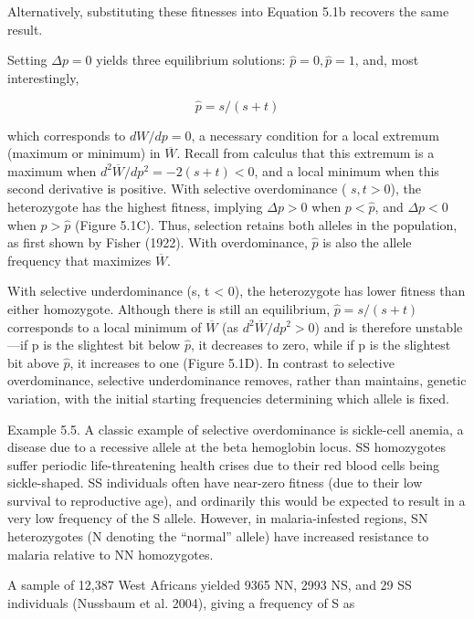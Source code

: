\documentclass{article}
\begin{document}
Alternatively, substituting these fitnesses into Equation 5.1b recovers the same result.

Setting  $ \Delta p = 0 $ yields three equilibrium solutions:  $ \widehat{p} = 0, \widehat{p} = 1 $, and, most interestingly,

\begin{equation}
\widehat{p}=s/(s+t)
\end{equation}

which corresponds to  $ dW/dp = 0 $, a necessary condition for a local extremum (maximum or minimum) in  $ \overline{W} $. Recall from calculus that this extremum is a maximum when  $ d^2\overline{W}/dp^2 = -2(s + t) < 0 $, and a local minimum when this second derivative is positive. With selective overdominance ( $ s, t > 0 $), the heterozygote has the highest fitness, implying  $ \Delta p > 0 $ when  $ p < \widehat{p} $, and  $ \Delta p < 0 $ when  $ p > \widehat{p} $ (Figure 5.1C). Thus, selection retains both alleles in the population, as first shown by Fisher (1922). With overdominance,  $ \widehat{p} $ is also the allele frequency that maximizes  $ \overline{W} $.

With selective underdominance (s, t < 0), the heterozygote has lower fitness than either homozygote. Although there is still an equilibrium,  $ \widehat{p} = s/(s + t) $ corresponds to a local minimum of  $ \overline{W} $ (as  $ d^2 \overline{W}/dp^2 > 0 $) and is therefore unstable—if p is the slightest bit below  $ \widehat{p} $, it decreases to zero, while if p is the slightest bit above  $ \widehat{p} $, it increases to one (Figure 5.1D). In contrast to selective overdominance, selective underdominance removes, rather than maintains, genetic variation, with the initial starting frequencies determining which allele is fixed.

Example 5.5. A classic example of selective overdominance is sickle-cell anemia, a disease due to a recessive allele at the beta hemoglobin locus. SS homozygotes suffer periodic life-threatening health crises due to their red blood cells being sickle-shaped. SS individuals often have near-zero fitness (due to their low survival to reproductive age), and ordinarily this would be expected to result in a very low frequency of the S allele. However, in malaria-infested regions, SN heterozygotes (N denoting the “normal” allele) have increased resistance to malaria relative to NN homozygotes.

A sample of 12,387 West Africans yielded 9365 NN, 2993 NS, and 29 SS individuals (Nussbaum et al. 2004), giving a frequency of S as
\end{document}
